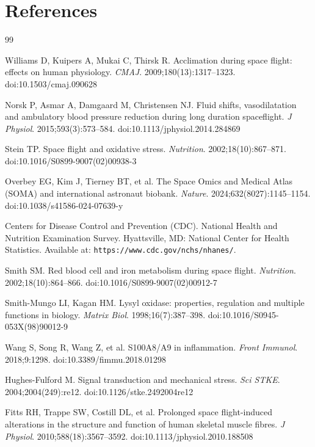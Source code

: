 \documentclass[11pt,a4paper]{article}
\begin{document}
\section*{References}

\begin{thebibliography}{99}

Williams D, Kuipers A, Mukai C, Thirsk R. Acclimation during space flight: effects on human physiology. \textit{CMAJ}. 2009;180(13):1317--1323. doi:10.1503/cmaj.090628

Norsk P, Asmar A, Damgaard M, Christensen NJ. Fluid shifts, vasodilatation and ambulatory blood pressure reduction during long duration spaceflight. \textit{J Physiol}. 2015;593(3):573--584. doi:10.1113/jphysiol.2014.284869

Stein TP. Space flight and oxidative stress. \textit{Nutrition}. 2002;18(10):867--871. doi:10.1016/S0899-9007(02)00938-3

Overbey EG, Kim J, Tierney BT, et al. The Space Omics and Medical Atlas (SOMA) and international astronaut biobank. \textit{Nature}. 2024;632(8027):1145--1154. doi:10.1038/s41586-024-07639-y

Centers for Disease Control and Prevention (CDC). National Health and Nutrition Examination Survey. Hyattsville, MD: National Center for Health Statistics. Available at: \texttt{https://www.cdc.gov/nchs/nhanes/}.

Smith SM. Red blood cell and iron metabolism during space flight. \textit{Nutrition}. 2002;18(10):864--866. doi:10.1016/S0899-9007(02)00912-7

Smith-Mungo LI, Kagan HM. Lysyl oxidase: properties, regulation and multiple functions in biology. \textit{Matrix Biol}. 1998;16(7):387--398. doi:10.1016/S0945-053X(98)90012-9

Wang S, Song R, Wang Z, et al. S100A8/A9 in inflammation. \textit{Front Immunol}. 2018;9:1298. doi:10.3389/fimmu.2018.01298

Hughes-Fulford M. Signal transduction and mechanical stress. \textit{Sci STKE}. 2004;2004(249):re12. doi:10.1126/stke.2492004re12

Fitts RH, Trappe SW, Costill DL, et al. Prolonged space flight-induced alterations in the structure and function of human skeletal muscle fibres. \textit{J Physiol}. 2010;588(18):3567--3592. doi:10.1113/jphysiol.2010.188508


\end{thebibliography}
\end{document}

